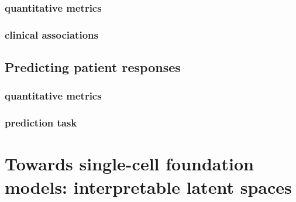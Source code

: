 \subsection{quantitative metrics}
\subsection{clinical associations}

\section{ Predicting patient responses}
\subsection{ quantitative metrics}
\subsection{ prediction task}

\chapter{Towards single-cell foundation models: interpretable latent spaces}
